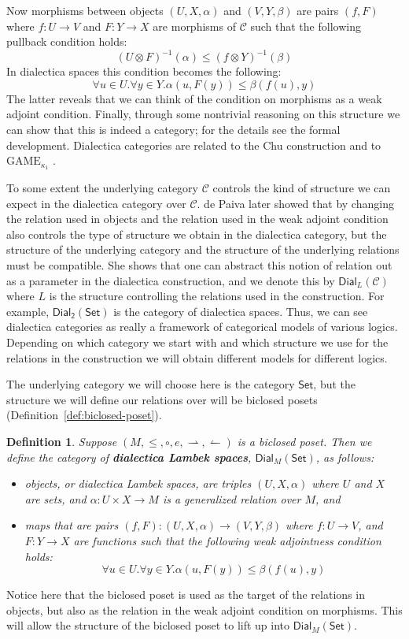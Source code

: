 \documentclass{article}
\let\mto\to                     %
\let\to\relax                   %
\newcommand{\to}{\rightarrow}
\newcommand{\rto}{\leftharpoonup}
\newcommand{\lto}{\rightharpoonup}
\newcommand{\cat}[1]{\mathcal{#1}}
\newcommand{\Set}{\mathsf{Set}}
\newcommand{\Dial}[2]{\mathsf{Dial}_{#1}(#2)}
\newtheorem{definition}[theorem]{Definition}
\begin{document}
Now morphisms between objects $(U, X, \alpha)$ and $(V, Y, \beta)$ are
pairs $(f, F)$ where $f : U \mto V$ and $F : Y \mto X$ are morphisms
of $\cat{C}$ such that the following pullback condition holds:
\[
(U \otimes F)^{-1}(\alpha) \leq (f \otimes Y)^{-1}(\beta)
\]
In dialectica spaces this condition becomes the following:
\[
\forall u \in U.\forall y \in Y. \alpha(u , F(y)) \leq \beta(f(u), y)
\]
The latter reveals that we can think of the condition on morphisms as
a weak adjoint condition.  Finally, through some nontrivial reasoning
on this structure we can show that this is indeed a category; for the
details see the formal development.  Dialectica categories are related
to the Chu construction \cite{?} and to $\text{GAME}_{\kappa_1}$
\cite{?}.

To some extent the underlying category $\cat{C}$ controls the kind of
structure we can expect in the dialectica category over $\cat{C}$.  de
Paiva later showed \cite{?} that by changing the relation used in
objects and the relation used in the weak adjoint condition also
controls the type of structure we obtain in the dialectica category,
but the structure of the underlying category and the structure of the
underlying relations must be compatible.  She shows that one can
abstract this notion of relation out as a parameter in the dialectica
construction, and we denote this by $\mathsf{Dial}_{L}(\cat{C})$ where
$L$ is the structure controlling the relations used in the
construction.  For example, $\mathsf{Dial}_{\mathsf{2}}(\Set)$ is the
category of dialectica spaces.  Thus, we can see dialectica categories
as really a framework of categorical models of various logics.
Depending on which category we start with and which structure we use
for the relations in the construction we will obtain different models
for different logics.

The underlying category we will choose here is the category $\Set$,
but the structure we will define our relations over will be biclosed
posets (Definition~\ref{def:biclosed-poset}).
\begin{definition}
  \label{def:dialectica-lambek-spaces}
  Suppose $(M, \leq, \circ, e, \lto, \rto)$ is a biclosed poset. Then
  we define the category of \textbf{dialectica Lambek spaces},
  $\mathsf{Dial}_M(\Set)$, as follows:
  \begin{itemize}
  \item[-] objects, or dialectica Lambek spaces, are triples $(U, X,
    \alpha)$ where $U$ and $X$ are sets, and $\alpha : U \times X \mto
    M$ is a generalized relation over $M$, and

  \item[-] maps that are pairs $(f, F) : (U , X, \alpha) \mto (V , Y ,
    \beta)$ where $f : U \mto V$, and $F : Y \mto X$ are functions
    such that the following weak adjointness condition holds:
    \[
    \forall u \in U.\forall y \in Y. \alpha(u , F(y)) \leq \beta(f(u), y)
    \]
  \end{itemize}
\end{definition}
Notice here that the biclosed poset is used as the target of the
relations in objects, but also as the relation in the weak adjoint
condition on morphisms.  This will allow the structure of the biclosed
poset to lift up into $\Dial{M}{\Set}$.
\end{document}
